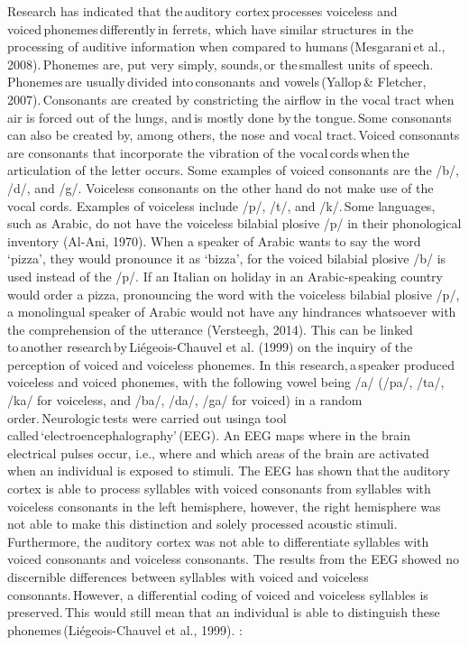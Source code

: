 Research has indicated that the auditory cortex processes voiceless and voiced phonemes differently in ferrets, which have similar structures in the processing of auditive information when compared to humans (Mesgarani et al., 2008). Phonemes are, put very simply, sounds, or the smallest units of speech. Phonemes are usually divided into consonants and vowels (Yallop & Fletcher, 2007). Consonants are created by constricting the airflow in the vocal tract when air is forced out of the lungs, and is mostly done by the tongue. Some consonants can also be created by, among others, the nose and vocal tract. Voiced consonants are consonants that incorporate the vibration of the vocal cords when the articulation of the letter occurs. Some examples of voiced consonants are the /b/, /d/, and /g/. Voiceless consonants on the other hand do not make use of the vocal cords. Examples of voiceless include /p/, /t/, and /k/. Some languages, such as Arabic, do not have the voiceless bilabial plosive /p/ in their phonological inventory (Al-Ani, 1970). When a speaker of Arabic wants to say the word ‘pizza’, they would pronounce it as ‘bizza’, for the voiced bilabial plosive /b/ is used instead of the /p/. If an Italian on holiday in an Arabic-speaking country would order a pizza, pronouncing the word with the voiceless bilabial plosive /p/, a monolingual speaker of Arabic would not have any hindrances whatsoever with the comprehension of the utterance (Versteegh, 2014). This can be linked to another research by Liégeois-Chauvel et al. (1999) on the inquiry of the perception of voiced and voiceless phonemes. In this research, a speaker produced voiceless and voiced phonemes, with the following vowel being /a/ (/pa/, /ta/, /ka/ for voiceless, and /ba/, /da/, /ga/ for voiced) in a random order. Neurologic tests were carried out usinga tool called ‘electroencephalography’ (EEG). An EEG maps where in the brain electrical pulses occur, i.e., where and which areas of the brain are activated when an individual is exposed to stimuli. The EEG has shown that the auditory cortex is able to process syllables with voiced consonants from syllables with voiceless consonants in the left hemisphere, however, the right hemisphere was not able to make this distinction and solely processed acoustic stimuli. Furthermore, the auditory cortex was not able to differentiate syllables with voiced consonants and voiceless consonants. The results from the EEG showed no discernible differences between syllables with voiced and voiceless consonants. However, a differential coding of voiced and voiceless syllables is preserved. This would still mean that an individual is able to distinguish these phonemes (Liégeois-Chauvel et al., 1999). :




